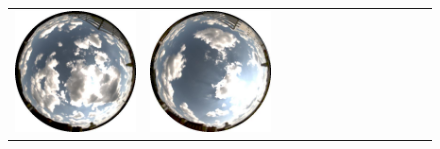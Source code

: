 \documentclass{report}
\begin{document}
\begin{figure}[!th]
\begin{tabular}{@{}rcccccccccccc@{}}
    \includegraphics[width=\customwidth]{./figures/database/20130824_145957.jpg} &
    \includegraphics[width=\customwidth]{./figures/database/20130824_152946.jpg} &

\end{tabular}
\end{figure}
\end{document}
